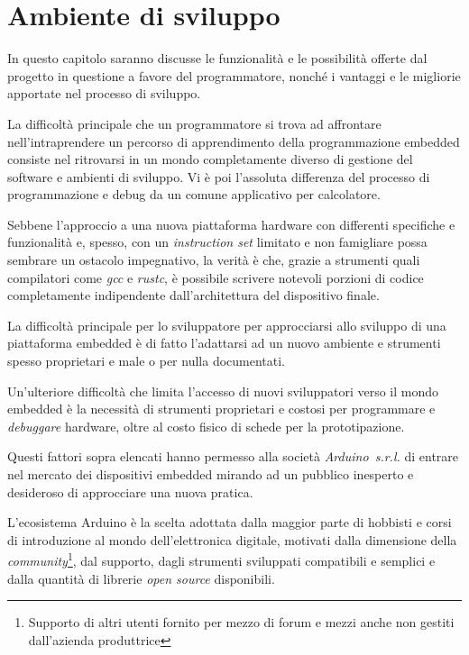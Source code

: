 \chapter{Ambiente di sviluppo}

In questo capitolo saranno discusse le funzionalità e le possibilità offerte dal progetto in questione a favore del programmatore, nonché i vantaggi e le migliorie apportate nel processo di sviluppo.

La difficoltà principale che un programmatore si trova ad affrontare nell'intraprendere un percorso di apprendimento della programmazione embedded consiste nel ritrovarsi in un mondo completamente diverso di gestione del software e ambienti di sviluppo. Vi è poi l'assoluta differenza del processo di programmazione e debug da un comune applicativo per calcolatore.

Sebbene l'approccio a una nuova piattaforma hardware con differenti specifiche e funzionalità e, spesso, con un \textit{instruction set} limitato e non famigliare possa sembrare un ostacolo impegnativo, la verità è che, grazie a strumenti quali compilatori come \textit{gcc} e \textit{rustc}, è possibile scrivere notevoli porzioni di codice completamente indipendente dall'architettura del dispositivo finale.

La difficoltà principale per lo sviluppatore per approcciarsi allo sviluppo di una piattaforma embedded è di fatto l'adattarsi ad un nuovo ambiente e strumenti spesso proprietari e male o per nulla documentati.

Un'ulteriore difficoltà che limita l'accesso di nuovi sviluppatori verso il mondo embedded è la necessità di strumenti proprietari e costosi per programmare e \textit{debuggare} hardware, oltre al costo fisico di schede per la prototipazione.

Questi fattori sopra elencati hanno permesso alla società \textit{Arduino~s.r.l.} di entrare nel mercato dei dispositivi embedded mirando ad un pubblico inesperto e desideroso di approcciare una nuova pratica\cite{site:arduino-about}.

L'ecosistema Arduino è la scelta adottata dalla maggior parte di hobbisti e corsi di introduzione al mondo dell'elettronica digitale, motivati dalla dimensione della \textit{community}\footnote{Supporto di altri utenti fornito per mezzo di forum e mezzi anche non gestiti dall'azienda produttrice}, dal supporto, dagli strumenti sviluppati compatibili e semplici e dalla quantità di librerie \textit{open source} disponibili.

